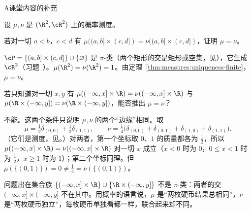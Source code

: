 \begin{exercises}{A}{课堂内容的补充}
\item\label{ex:measures:A9} 设 $\mu,\nu$ 是 $(\R^2,\cR^2)$ 上的概率测度。
\begin{questions}
\item 若对一切 $a<b$，$c<d$ 有 $\mu((a,b]\times(c,d])=\nu((a,b]\times(c,d])$，证明 $\mu=\nu$。
\begin{solution}
$\cP=\{(a,b]\times(c,d]\}\cup\{\varnothing\}$ 是 $\pi$-类（两个矩形的交是矩形或空集，见），它生成 $\cR^2$（习题~）。$\mu(\R^2)=\nu(\R^2)=1$。由定理~\ref{thm:measures:uniqueness-finite}，$\mu=\nu$。
\end{solution}
\item 若只知道对一切 $x,y$ 有 $\mu((-\infty,x]\times\R)=\nu((-\infty,x]\times\R)$ 与 $\mu(\R\times(-\infty,y])=\nu(\R\times(-\infty,y])$，能否推出 $\mu=\nu$？
\begin{solution}
不能。这两个条件只说明 $\mu,\nu$ 的两个“边缘”相同。取
\[
\mu=\tfrac12\delta_{(0,0)}+\tfrac12\delta_{(1,1)},\qquad\nu=\tfrac14\bigl(\delta_{(0,0)}+\delta_{(0,1)}+\delta_{(1,0)}+\delta_{(1,1)}\bigr).
\]
（它们是测度，见。）对两者，第一个坐标取 $0$、$1$ 的质量都各为 $\frac12$，所以 $\mu((-\infty,x]\times\R)=\nu((-\infty,x]\times\R)$ 对一切 $x$ 成立（$x<0$ 时为 $0$，$0\leqslant x<1$ 时为 $\frac12$，$x\geqslant1$ 时为 $1$）；第二个坐标同理。但 $\mu(\{(0,1)\})=0\neq\frac14=\nu(\{(0,1)\})$。

问题出在集合族 $\{(-\infty,x]\times\R\}\cup\{\R\times(-\infty,y]\}$ 不是 $\pi$-类：两者的交 $(-\infty,x]\times(-\infty,y]$ 不在其中。用概率的语言说，$\mu$ 是“两枚硬币结果总相同”，$\nu$ 是“两枚硬币独立”，每枚硬币单独看都一样，联合起来却不同。
\end{solution}
\end{questions}
\end{exercises}

